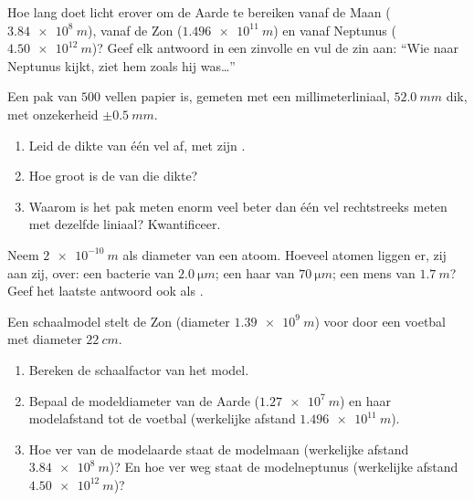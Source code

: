 \begin{exercise}[$\star\star$]\label{exo:g10:orders-of-magnitude:7}
Hoe lang doet licht erover om de Aarde te bereiken vanaf de Maan
($\qty{3.84e8}{m}$), vanaf de Zon ($\qty{1.496e11}{m}$) en vanaf
Neptunus ($\qty{4.50e12}{m}$)? Geef elk antwoord in een zinvolle
 en vul de zin aan: ``Wie naar Neptunus kijkt, ziet hem zoals
hij was\dots''
\end{exercise}

\begin{exercise}[$\star\star$]\label{exo:g10:orders-of-magnitude:8}
Een pak van $500$ vellen papier is, gemeten met een
millimeterliniaal, $\qty{52.0}{mm}$ dik, met onzekerheid
$\pm\qty{0.5}{mm}$.
\begin{enumerate}
  \item Leid de dikte van één vel af, met zijn .
  \item Hoe groot is de  van die dikte?
  \item Waarom is het pak meten enorm veel beter dan één vel
        rechtstreeks meten met dezelfde liniaal? Kwantificeer.
\end{enumerate}
\end{exercise}

\begin{exercise}[$\star\star$]\label{exo:g10:orders-of-magnitude:9}
Neem $\qty{2e-10}{m}$ als diameter van een atoom. Hoeveel atomen
liggen er, zij aan zij, over: een bacterie van $\qty{2.0}{\micro m}$;
een haar van $\qty{70}{\micro m}$; een mens van $\qty{1.7}{m}$? Geef
het laatste antwoord ook als .
\end{exercise}

\begin{exercise}[$\star\star$]\label{exo:g10:orders-of-magnitude:10}
Een schaalmodel stelt de Zon (diameter $\qty{1.39e9}{m}$) voor door een
voetbal met diameter $\qty{22}{cm}$.
\begin{enumerate}
  \item Bereken de schaalfactor van het model.
  \item Bepaal de modeldiameter van de Aarde ($\qty{1.27e7}{m}$) en
        haar modelafstand tot de voetbal (werkelijke afstand
        $\qty{1.496e11}{m}$).
  \item Hoe ver van de modelaarde staat de modelmaan (werkelijke
        afstand $\qty{3.84e8}{m}$)? En hoe ver weg staat de
        modelneptunus (werkelijke afstand $\qty{4.50e12}{m}$)?
\end{enumerate}
\end{exercise}

